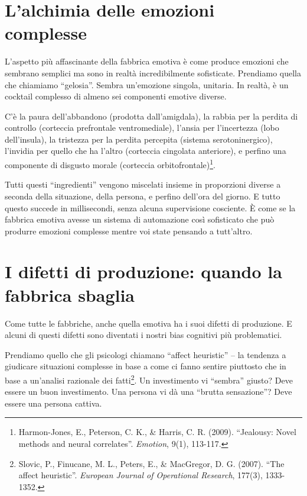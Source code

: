 \section{L'alchimia delle emozioni complesse}

L'aspetto più affascinante della fabbrica emotiva è come produce emozioni che sembrano semplici ma sono in realtà incredibilmente sofisticate. Prendiamo quella che chiamiamo ``gelosia''. Sembra un'emozione singola, unitaria. In realtà, è un cocktail complesso di almeno sei componenti emotive diverse.

C'è la paura dell'abbandono (prodotta dall'amigdala), la rabbia per la perdita di controllo (corteccia prefrontale ventromediale), l'ansia per l'incertezza (lobo dell'insula), la tristezza per la perdita percepita (sistema serotoninergico), l'invidia per quello che ha l'altro (corteccia cingolata anteriore), e perfino una componente di disgusto morale (corteccia orbitofrontale)\footnote{Harmon-Jones, E., Peterson, C. K., \& Harris, C. R. (2009). ``Jealousy: Novel methods and neural correlates''. \textit{Emotion}, 9(1), 113-117.}.

Tutti questi ``ingredienti'' vengono miscelati insieme in proporzioni diverse a seconda della situazione, della persona, e perfino dell'ora del giorno. E tutto questo succede in millisecondi, senza alcuna supervisione cosciente. È come se la fabbrica emotiva avesse un sistema di automazione così sofisticato che può produrre emozioni complesse mentre voi state pensando a tutt'altro.

\section{I difetti di produzione: quando la fabbrica sbaglia}

Come tutte le fabbriche, anche quella emotiva ha i suoi difetti di produzione. E alcuni di questi difetti sono diventati i nostri bias cognitivi più problematici.

Prendiamo quello che gli psicologi chiamano ``affect heuristic'' -- la tendenza a giudicare situazioni complesse in base a come ci fanno sentire piuttosto che in base a un'analisi razionale dei fatti\footnote{Slovic, P., Finucane, M. L., Peters, E., \& MacGregor, D. G. (2007). ``The affect heuristic''. \textit{European Journal of Operational Research}, 177(3), 1333-1352.}. Un investimento vi ``sembra'' giusto? Deve essere un buon investimento. Una persona vi dà una ``brutta sensazione''? Deve essere una persona cattiva.

